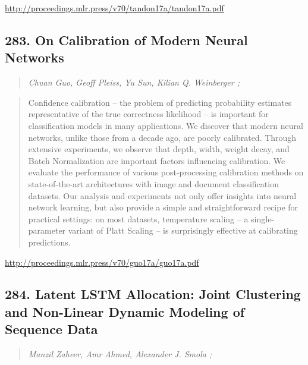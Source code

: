 \documentclass{article}
\begin{document}
\href{http://proceedings.mlr.press/v70/tandon17a/tandon17a.pdf}{http://proceedings.mlr.press/v70/tandon17a/tandon17a.pdf}

\subsection{283. On Calibration of Modern Neural Networks}

\begin{quote}
\footnotesize{\textit{Chuan Guo, Geoff Pleiss, Yu Sun, Kilian Q. Weinberger ;}}

\end{quote}

\begin{quote}
    Confidence calibration – the problem of predicting probability estimates representative of the true correctness likelihood – is important for classification models in many applications. We discover that modern neural networks, unlike those from a decade ago, are poorly calibrated. Through extensive experiments, we observe that depth, width, weight decay, and Batch Normalization are important factors influencing calibration. We evaluate the performance of various post-processing calibration methods on state-of-the-art architectures with image and document classification datasets. Our analysis and experiments not only offer insights into neural network learning, but also provide a simple and straightforward recipe for practical settings: on most datasets, temperature scaling – a single-parameter variant of Platt Scaling – is surprisingly effective at calibrating predictions.  
\end{quote}

\href{http://proceedings.mlr.press/v70/guo17a/guo17a.pdf}{http://proceedings.mlr.press/v70/guo17a/guo17a.pdf}

\subsection{284. Latent LSTM Allocation: Joint Clustering and Non-Linear Dynamic Modeling of Sequence Data}

\begin{quote}
\footnotesize{\textit{Manzil Zaheer, Amr Ahmed, Alexander J. Smola ;}}

\end{quote}
\end{document}
